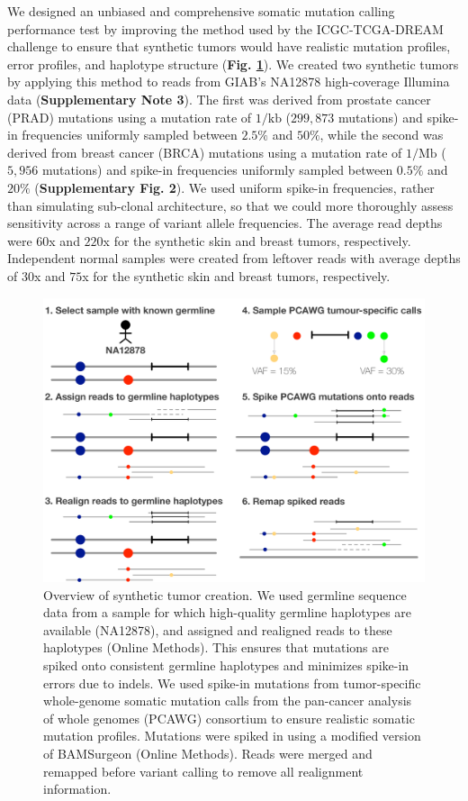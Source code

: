\documentclass[notitlepage, twocolumn, 10pt]{article}
\begin{document}
We designed an unbiased and comprehensive somatic mutation calling performance test by improving the method used by the ICGC-TCGA-DREAM challenge to ensure that synthetic tumors would have realistic mutation profiles, error profiles, and haplotype structure (\textbf{Fig. \ref{fig:syntumor}}). We created two synthetic tumors by applying this method to reads from GIAB's NA12878 high-coverage Illumina data (\textbf{Supplementary Note 3}). The first was derived from prostate cancer (PRAD) mutations using a mutation rate of $1/\text{kb}$ ($299,873$ mutations) and spike-in frequencies uniformly sampled between $2.5\%$ and $50\%$, while the second was derived from breast cancer (BRCA) mutations using a mutation rate of $1/\text{Mb}$ ($5,956$ mutations) and spike-in frequencies uniformly sampled between $0.5\%$ and $20\%$ (\textbf{Supplementary Fig. 2}). We used uniform spike-in frequencies, rather than simulating sub-clonal architecture, so that we could more thoroughly assess sensitivity across a range of variant allele frequencies. The average read depths were $60$x and $220$x for the synthetic skin and breast tumors, respectively. Independent normal samples were created from leftover reads with average depths of $30$x and $75$x for the synthetic skin and breast tumors, respectively.

\begin{figure}[tp]
    \includegraphics[width=\linewidth]{figures/syntumour}
    \caption{Overview of synthetic tumor creation. We used germline sequence data from a sample for which high-quality germline haplotypes are available (NA12878), and assigned and realigned reads to these haplotypes (Online Methods). This ensures that mutations are spiked onto consistent germline haplotypes and minimizes spike-in errors due to indels. We used spike-in mutations from tumor-specific whole-genome somatic mutation calls from the pan-cancer analysis of whole genomes (PCAWG) consortium \cite{RN471, RN566} to ensure realistic somatic mutation profiles. Mutations were spiked in using a modified version of BAMSurgeon \cite{RN147} (Online Methods). Reads were merged and remapped before variant calling to remove all realignment information.}
    \label{fig:syntumor}
\end{figure}
\end{document}
